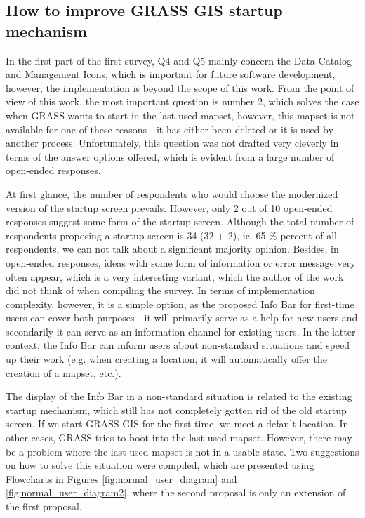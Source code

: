 \documentclass[a4paper,10pt,twoside]{article}
\begin{document}
\subsection{How to improve GRASS GIS startup mechanism}
\label{sec:proposal2}

In the first part of the first survey, Q4 and Q5 mainly concern the Data Catalog and Management Icons, which is important for future software development, however, the implementation is beyond the scope of this work. From the point of view of this work, the most important question is number 2, which solves the case when GRASS wants to start in the last used mapset, however, this mapset is not available for one of these reasons - it has either been deleted or it is used by another process. Unfortunately, this question was not drafted very cleverly in terms of the answer options offered, which is evident from a large number of open-ended responses.

At first glance, the number of respondents who would choose the modernized version of the startup screen prevails. However, only 2 out of 10 open-ended responses suggest some form of the startup screen. Although the total number of respondents proposing a startup screen is 34 (32 + 2), ie. 65 \% percent of all respondents, we can not talk about a significant majority opinion. Besides, in open-ended responses, ideas with some form of information or error message very often appear, which is a very interesting variant, which the author of the work did not think of when compiling the survey. In terms of implementation complexity, however, it is a simple option, as the proposed Info Bar for first-time users can cover both purposes - it will primarily serve as a help for new users and secondarily it can serve as an information channel for existing users. In the latter context, the Info Bar can inform users about non-standard situations and speed up their work (e.g. when creating a location, it will automatically offer the creation of a mapset, etc.).

The display of the Info Bar in a non-standard situation is related to the existing startup mechanism, which still has not completely gotten rid of the old startup screen. If we start GRASS GIS for the first time, we meet a default location. In other cases, GRASS tries to boot into the last used mapset. However, there may be a problem where the last used mapset is not in a usable state. Two suggestions on how to solve this situation were compiled, which are presented using Flowcharts in Figures \ref{fig:normal_user_diagram} and \ref{fig:normal_user_diagram2}, where the second proposal is only an extension of the first proposal.
\end{document}
